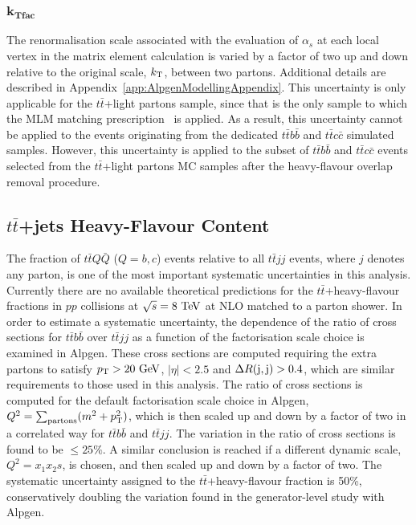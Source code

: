 \subsubsection*{$\mathbf{k_{Tfac}}$}
The renormalisation scale associated with the evaluation of $\alpha_s$ at each local
vertex in the matrix element calculation is varied by a factor of two
up and down relative to the original scale, $k_{\rm T}$, between two
partons.  
\ifIsINT 
Additional details are described in Appendix~\ref{app:AlpgenModellingAppendix}.
\fi 
This uncertainty is only applicable for the $t\bar{t}$+light partons
sample, since that is the only sample to which the MLM matching prescription~\cite{mlm} is
applied. As a result, this uncertainty cannot be applied to the events 
originating from the dedicated $t\bar{t}b\bar{b}$ and $t\bar{t}c\bar{c}$
simulated samples. However, this uncertainty is applied to the subset of $t\bar{t}b\bar{b}$ and $t\bar{t}c\bar{c}$
events selected from the $t\bar{t}$+light partons MC samples after the
heavy-flavour overlap removal procedure.


\subsection{$t\bar{t}$+jets Heavy-Flavour Content}
\label{sec:syst_ttbarHF}
The fraction of $t\bar{t}Q\bar{Q}$ ($Q=b,c$) events relative to all $t\bar{t}jj$ events, where $j$ denotes any parton,
is one of the most important systematic uncertainties in this analysis. 
Currently there are no available theoretical predictions for the $t\bar{t}$+heavy-flavour fractions in $pp$ collisions at $\sqrt{s}=8\tev$ at NLO matched to a parton shower.
In order to estimate a systematic uncertainty, the dependence of the ratio of cross sections for $t\bar{t}b\bar{b}$ over
$t\bar{t}jj$ as a function of the factorisation scale choice is examined in {\sc Alpgen}. These cross
sections are computed requiring the extra partons to satisfy $\pt>20\gev$, $|\eta|<2.5$ and $\Delta R({\rm j},{\rm j})>0.4$, which are similar requirements
to those used in this analysis. The ratio of cross sections is computed for the default factorisation scale choice
in {\sc Alpgen}, $Q^2=\sum_{\rm partons} (m^2 + \pt^2)$, which is then scaled up and down by a factor of two
in a correlated way for $t\bar{t}b\bar{b}$ and $t\bar{t}jj$.
The variation in the ratio of cross sections is found to be $\leq 25\%$. A similar conclusion is reached if a
different dynamic scale,  $Q^2=x_1 x_2 s$, is chosen, and then scaled up and down by a factor of two.
The systematic uncertainty assigned to the $t\bar{t}$+heavy-flavour fraction is 50\%, conservatively doubling
the variation found in the generator-level study with {\sc Alpgen}. 

